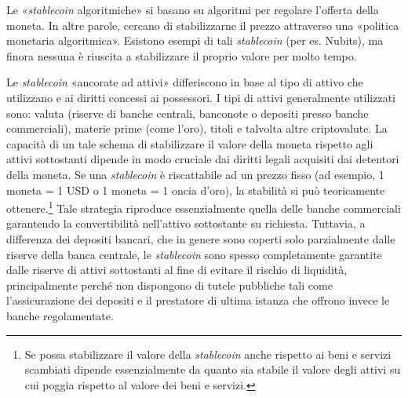\documentclass{article}
\begin{document}
Le «\textit{stablecoin} algoritmiche» si basano su algoritmi per regolare
l'offerta della moneta. In altre parole, cercano di stabilizzarne il
prezzo attraverso una «politica monetaria algoritmica». Esistono
esempi di tali \textit{stablecoin} (per es. Nubits), ma finora nessuna è
riuscita a stabilizzare il proprio valore per molto tempo.

Le \textit{stablecoin} «ancorate ad attivi» differiscono in base al tipo
di attivo che utilizzano e ai diritti concessi ai possessori. I tipi di
attivi generalmente utilizzati sono: valuta (riserve di banche centrali,
banconote o depositi presso banche commerciali), materie prime (come
l'oro), titoli e talvolta altre criptovalute. La capacità di un tale
schema di stabilizzare il valore della moneta rispetto agli attivi
sottostanti dipende in modo cruciale dai diritti legali acquisiti dai
detentori della moneta. Se una \textit{stablecoin} è riscattabile ad un
prezzo fisso (ad esempio, 1 moneta = 1 USD o 1 moneta = 1 oncia d'oro),
la stabilità si può teoricamente ottenere.\footnote{Se possa stabilizzare
il valore della \textit{stablecoin} anche rispetto ai beni e servizi
scambiati dipende essenzialmente da quanto sia stabile il valore degli
attivi su cui poggia rispetto al valore dei beni e servizi.} Tale strategia
riproduce essenzialmente quella delle banche commerciali garantendo la
convertibilità nell'attivo sottostante su richiesta. Tuttavia, a differenza
dei depositi bancari, che in genere sono coperti solo parzialmente dalle
riserve della banca centrale, le  \textit{stablecoin} sono spesso
completamente garantite dalle riserve di attivi sottostanti al fine di
evitare il rischio di liquidità, principalmente perché non dispongono di
tutele pubbliche tali come l'assicurazione dei depositi e il prestatore
di ultima istanza che offrono invece le banche regolamentate.
\end{document}
